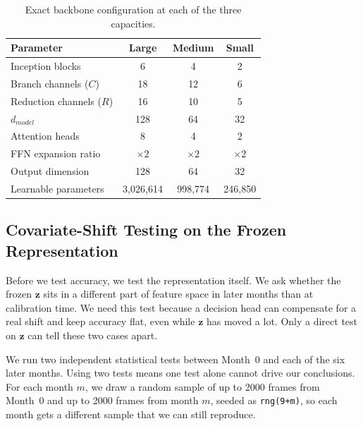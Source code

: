 \documentclass[journal]{IEEEtran}
\begin{document}
\begin{table}[t]
\caption{Exact backbone configuration at each of the three capacities.}
\label{tab:capacities}
\centering
\begin{tabular}{@{}lccc@{}}
\toprule
\textbf{Parameter} & \textbf{Large} & \textbf{Medium} & \textbf{Small} \\
\midrule
Inception blocks & 6 & 4 & 2 \\
Branch channels ($C$) & 18 & 12 & 6 \\
Reduction channels ($R$) & 16 & 10 & 5 \\
$d_{model}$ & 128 & 64 & 32 \\
Attention heads & 8 & 4 & 2 \\
FFN expansion ratio & $\times2$ & $\times2$ & $\times2$ \\
Output dimension & 128 & 64 & 32 \\
Learnable parameters & 3{,}026{,}614 & 998{,}774 & 246{,}850 \\
\bottomrule
\end{tabular}
\end{table}

\subsection{Covariate-Shift Testing on the Frozen Representation}
\label{sec:covshift}
Before we test accuracy, we test the representation itself. We ask whether the frozen $\mathbf{z}$ sits in a different part of feature space in later months than at calibration time. We need this test because a decision head can compensate for a real shift and keep accuracy flat, even while $\mathbf{z}$ has moved a lot. Only a direct test on $\mathbf{z}$ can tell these two cases apart.

We run two independent statistical tests between Month~0 and each of the six later months. Using two tests means one test alone cannot drive our conclusions. For each month $m$, we draw a random sample of up to 2000 frames from Month~0 and up to 2000 frames from month $m$, seeded as \texttt{rng(9+m)}, so each month gets a different sample that we can still reproduce.
\end{document}
